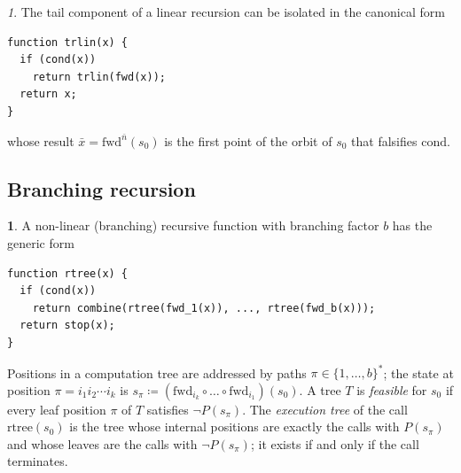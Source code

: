 \documentclass[oneside,english]{amsart}
\numberwithin{equation}{section}
\numberwithin{figure}{section}
\theoremstyle{plain}
\theoremstyle{definition}
\theoremstyle{plain}
\theoremstyle{remark}
\newtheorem*{rem*}{\protect\remarkname}
\theoremstyle{plain}
\theoremstyle{definition}
\newtheorem*{defn*}{\protect\definitionname}
\theoremstyle{plain}
\theoremstyle{remark}
\providecommand{\definitionname}{Definition}
\providecommand{\remarkname}{Remark}
\begin{document}
\begin{rem*}
The tail component of a linear recursion can be isolated in the canonical form
\begin{lstlisting}
function trlin(x) {
  if (cond(x))
    return trlin(fwd(x));
  return x;
}
\end{lstlisting}
whose result $\bar{x} = \text{fwd}^{\bar{n}}(s_0)$ is the first point of the orbit of $s_0$ that falsifies $\text{cond}$.
\end{rem*}

\subsection{Branching recursion}

\begin{defn*}
A non-linear (branching) recursive function with branching factor $b$ has the generic form
\begin{lstlisting}
function rtree(x) {
  if (cond(x))
    return combine(rtree(fwd_1(x)), ..., rtree(fwd_b(x)));
  return stop(x);
}
\end{lstlisting}
\end{defn*}

Positions in a computation tree are addressed by paths $\pi \in \{1, \dots, b\}^*$; the state at position $\pi = i_1 i_2 \cdots i_k$ is $s_\pi \coloneqq (\text{fwd}_{i_k} \circ \dots \circ \text{fwd}_{i_1})(s_0)$. A tree $T$ is \textit{feasible} for $s_0$ if every leaf position $\pi$ of $T$ satisfies $\neg P(s_\pi)$. The \textit{execution tree} of the call $\text{rtree}(s_0)$ is the tree whose internal positions are exactly the calls with $P(s_\pi)$ and whose leaves are the calls with $\neg P(s_\pi)$; it exists if and only if the call terminates.
\end{document}
